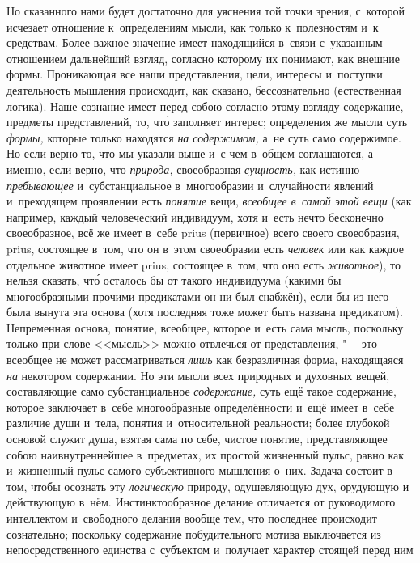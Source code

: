 Но сказанного нами будет достаточно для уяснения той точки зрения, с~которой
исчезает отношение к~определениям мысли, как только к~полезностям и~к
средствам. Более важное значение имеет находящийся в~связи с~указанным
отношением дальнейший взгляд, согласно которому их понимают, как внешние формы.
Проникающая все наши представления, цели, интересы и~поступки деятельность
мышления происходит, как сказано, бессознательно (естественная логика). Наше
сознание имеет перед собою согласно этому взгляду содержание, предметы
представлений, то, чт\'{о} заполняет интерес; определения же мысли суть
{\em формы,} которые только находятся {\em на содержимом,} а~не суть само
содержимое. Но если верно то, что мы указали выше и~с чем в~общем соглашаются,
а именно, если верно, что {\em природа,} своеобразная {\em сущность,} как
истинно {\em пребывающее} и~субстанциальное в~многообразии и~случайности
явлений и~преходящем проявлении есть {\em понятие} вещи, {\em всеобщее в~самой
этой вещи} (как например, каждый человеческий индивидуум, хотя и~есть нечто
бесконечно своеобразное, всё же имеет в~себе prius (первичное) всего своего
своеобразия, prius, состоящее в~том, что он в~этом своеобразии есть
{\em человек} или как каждое отдельное животное имеет prius, состоящее в~том,
что оно есть {\em животное}), то нельзя сказать, чт\'{о} осталось бы от такого
индивидуума (какими бы многообразными прочими предикатами он ни был снабжён),
если бы из него была вынута эта основа (хотя последняя тоже может быть названа
предикатом). Непременная основа, понятие, всеобщее, которое и~есть сама мысль,
поскольку только при слове <<мысль>> можно отвлечься от представления, "--- это
всеобщее не может рассматриваться {\em лишь} как безразличная форма,
находящаяся {\em на} некотором содержании. Но эти мысли всех природных и
духовных вещей, составляющие само субстанциальное {\em содержание,} суть ещё
такое содержание, которое заключает в~себе многообразные определённости и~ещё
имеет в~себе различие души и~тела, понятия и~относительной реальности; более
глубокой основой служит душа, взятая сама по себе, чистое понятие,
представляющее собою наивнутреннейшее в~предметах, их простой жизненный пульс,
равно как и~жизненный пульс самого субъективного мышления о~них. Задача состоит
в том, чтобы осознать эту {\em логическую} природу, одушевляющую дух, орудующую
и действующую в~нём. Инстинктообразное делание отличается от руководимого
интеллектом и~свободного делания вообще тем, что последнее происходит
сознательно; поскольку содержание побудительного мотива выключается из
непосредственного единства с~субъектом и~получает характер стоящей перед ним
